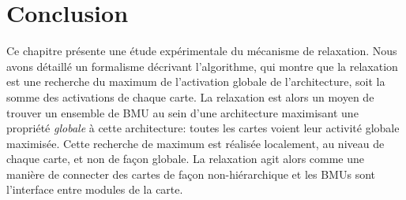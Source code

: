 \documentclass[../main]{subfiles}
\begin{document}

%



\section{Conclusion}

Ce chapitre présente une étude expérimentale du mécanisme de relaxation. Nous avons détaillé un formalisme décrivant l'algorithme, qui montre que la relaxation est une recherche du maximum de l'activation globale de l'architecture, soit la somme des activations de chaque carte.
La relaxation est alors un moyen de trouver un ensemble de BMU au sein d'une architecture maximisant une propriété \emph{globale} à cette architecture: toutes les cartes voient leur activité globale maximisée. 
Cette recherche de maximum est réalisée localement, au niveau de chaque carte, et non de façon globale. La relaxation agit alors comme une manière de connecter des cartes de façon non-hiérarchique et les BMUs sont 
l'interface entre modules de la carte.
\end{document}
